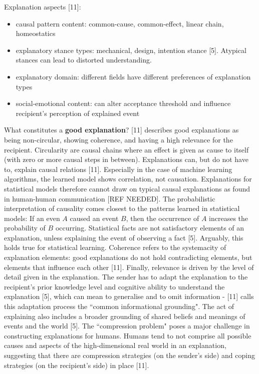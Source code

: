 Explanation aspects [11]:
\begin{itemize}
	\item causal pattern content: common-cause, common-effect, linear chain, homeostatics
	\item explanatory stance types: mechanical, design, intention stance [5]. Atypical stances can lead to distorted understanding.
	\item explanatory domain: different fields have different preferences of explanation types
	\item social-emotional content: can alter acceptance threshold and influence recipient's perception of explained event 
\end{itemize}
What constitutes a \textbf{good explanation}? [11] describes good explanations as being non-circular, showing coherence, and having a high relevance for the recipient. Circularity are causal chains where an effect is given as cause to itself (with zero or more causal steps in between). Explanations can, but do not have to, explain causal relations [11]. Especially in the case of machine learning algorithms, the learned model shows correlation, not causation. Explanations for statistical models therefore cannot draw on typical causal explanations as found in human-human communication {\color{red}[REF NEEDED]}. The probabilistic interpretation of causality comes closest to the patterns learned in statistical models: If an even $A$ caused an event $B$, then the occurrence of $A$ increases the probability of $B$ occurring. Statistical facts are not satisfactory elements of an explanation, unless explaining the event of observing a fact [5]. Arguably, this holds true for statistical learning. Coherence refers to the systemacity of explanation elements: good explanations do not hold contradicting elements, but elements that influence each other [11]. Finally, relevance is driven by the level of detail given in the explanation. The sender has to adapt the explanation to the recipient's prior knowledge level and cognitive ability to understand the explanation [5], which can mean to generalise and to omit information - [11] calls this adaptation process the ``common informational grounding". The act of explaining also includes a broader grounding of shared beliefs and meanings of events and the world [5]. The ``compression problem" poses a major challenge in constructing explanations for humans. Humans tend to not comprise all possible causes and aspects of the high-dimensional real world in an explanation, suggesting that there are compression strategies (on the sender's side) and coping strategies (on the recipient's side) in place [11]. \newline
